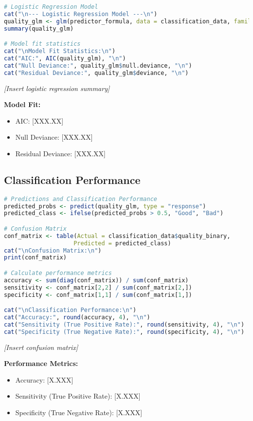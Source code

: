 \begin{lstlisting}[language=R, caption=Logistic Regression for Quality Classification]
# Logistic Regression Model
cat("\n--- Logistic Regression Model ---\n")
quality_glm <- glm(predictor_formula, data = classification_data, family = binomial)
summary(quality_glm)

# Model fit statistics
cat("\nModel Fit Statistics:\n")
cat("AIC:", AIC(quality_glm), "\n")
cat("Null Deviance:", quality_glm$null.deviance, "\n")
cat("Residual Deviance:", quality_glm$deviance, "\n")
\end{lstlisting}

\textit{[Insert logistic regression summary]}

\textbf{Model Fit:}
\begin{itemize}
    \item AIC: [XXX.XX]
    \item Null Deviance: [XXX.XX]
    \item Residual Deviance: [XXX.XX]
\end{itemize}

\subsection{Classification Performance}

\begin{lstlisting}[language=R, caption=Classification Performance Evaluation]
# Predictions and Classification Performance
predicted_probs <- predict(quality_glm, type = "response")
predicted_class <- ifelse(predicted_probs > 0.5, "Good", "Bad")

# Confusion Matrix
conf_matrix <- table(Actual = classification_data$quality_binary, 
                    Predicted = predicted_class)
cat("\nConfusion Matrix:\n")
print(conf_matrix)

# Calculate performance metrics
accuracy <- sum(diag(conf_matrix)) / sum(conf_matrix)
sensitivity <- conf_matrix[2,2] / sum(conf_matrix[2,])
specificity <- conf_matrix[1,1] / sum(conf_matrix[1,])

cat("\nClassification Performance:\n")
cat("Accuracy:", round(accuracy, 4), "\n")
cat("Sensitivity (True Positive Rate):", round(sensitivity, 4), "\n")
cat("Specificity (True Negative Rate):", round(specificity, 4), "\n")
\end{lstlisting}

\textit{[Insert confusion matrix]}

\textbf{Performance Metrics:}
\begin{itemize}
    \item Accuracy: [X.XXX]
    \item Sensitivity (True Positive Rate): [X.XXX]
    \item Specificity (True Negative Rate): [X.XXX]
\end{itemize}

